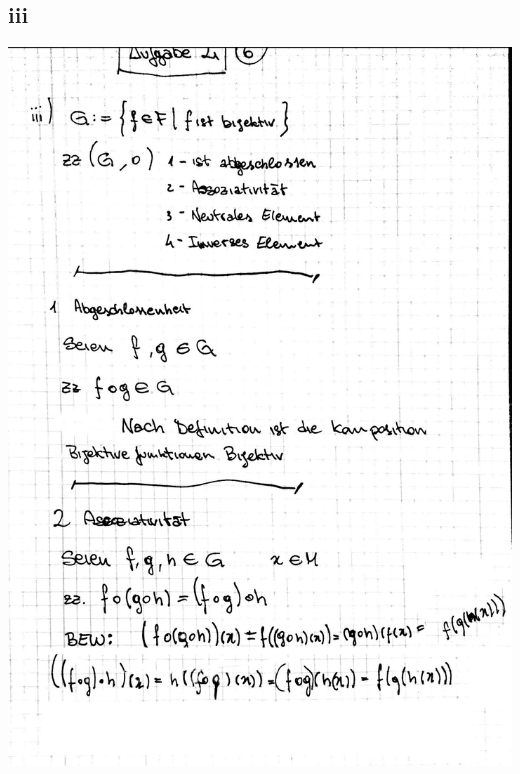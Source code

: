 \documentclass[10pt,a4paper]{article}
\begin{document}
\subsection{iii}
\includegraphics[width=\textwidth]{lat5b_6.jpg}
\end{document}
